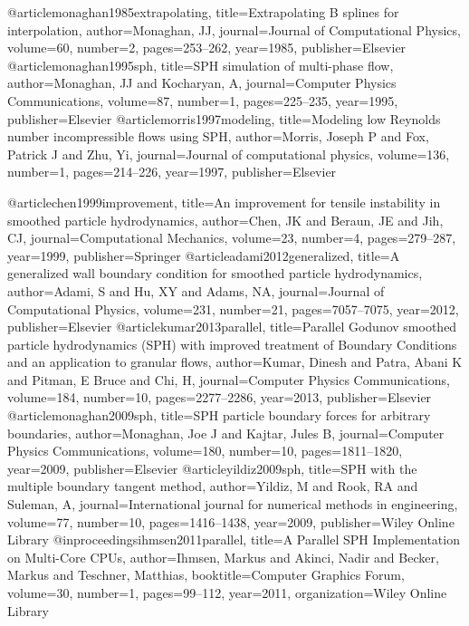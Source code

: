 @article{monaghan1985extrapolating,
  title={Extrapolating B splines for interpolation},
  author={Monaghan, JJ},
  journal={Journal of Computational Physics},
  volume={60},
  number={2},
  pages={253--262},
  year={1985},
  publisher={Elsevier}
}
@article{monaghan1995sph,
  title={SPH simulation of multi-phase flow},
  author={Monaghan, JJ and Kocharyan, A},
  journal={Computer Physics Communications},
  volume={87},
  number={1},
  pages={225--235},
  year={1995},
  publisher={Elsevier}
}
@article{morris1997modeling,
  title={Modeling low Reynolds number incompressible flows using SPH},
  author={Morris, Joseph P and Fox, Patrick J and Zhu, Yi},
  journal={Journal of computational physics},
  volume={136},
  number={1},
  pages={214--226},
  year={1997},
  publisher={Elsevier}
}

@article{chen1999improvement,
  title={An improvement for tensile instability in smoothed particle hydrodynamics},
  author={Chen, JK and Beraun, JE and Jih, CJ},
  journal={Computational Mechanics},
  volume={23},
  number={4},
  pages={279--287},
  year={1999},
  publisher={Springer}
}
@article{adami2012generalized,
  title={A generalized wall boundary condition for smoothed particle hydrodynamics},
  author={Adami, S and Hu, XY and Adams, NA},
  journal={Journal of Computational Physics},
  volume={231},
  number={21},
  pages={7057--7075},
  year={2012},
  publisher={Elsevier}
}
@article{kumar2013parallel,
  title={Parallel Godunov smoothed particle hydrodynamics (SPH) with improved treatment of Boundary Conditions and an application to granular flows},
  author={Kumar, Dinesh and Patra, Abani K and Pitman, E Bruce and Chi, H},
  journal={Computer Physics Communications},
  volume={184},
  number={10},
  pages={2277--2286},
  year={2013},
  publisher={Elsevier}
}
@article{monaghan2009sph,
  title={SPH particle boundary forces for arbitrary boundaries},
  author={Monaghan, Joe J and Kajtar, Jules B},
  journal={Computer Physics Communications},
  volume={180},
  number={10},
  pages={1811--1820},
  year={2009},
  publisher={Elsevier}
}
@article{yildiz2009sph,
  title={SPH with the multiple boundary tangent method},
  author={Yildiz, M and Rook, RA and Suleman, A},
  journal={International journal for numerical methods in engineering},
  volume={77},
  number={10},
  pages={1416--1438},
  year={2009},
  publisher={Wiley Online Library}
}
@inproceedings{ihmsen2011parallel,
  title={A Parallel SPH Implementation on Multi-Core CPUs},
  author={Ihmsen, Markus and Akinci, Nadir and Becker, Markus and Teschner, Matthias},
  booktitle={Computer Graphics Forum},
  volume={30},
  number={1},
  pages={99--112},
  year={2011},
  organization={Wiley Online Library}
}
